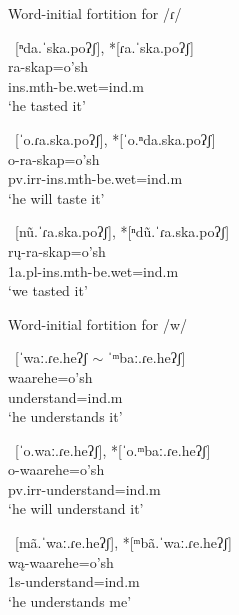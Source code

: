 \begin{exe}
\item\label{wordfortR} Word-initial fortition for /ɾ/
	\begin{xlist}
	\item\label{wordfortR1} ~\textnormal{[ⁿda.ˈska.poʔʃ], *[ɾa.ˈska.poʔʃ]}\\
	ra-skap=o'sh\\
	{ins.mth}-\textnormal{be.wet}={ind.m}\\
	\glt `he tasted it'
	\item\label{wordfortR2} ~\textnormal{[ˈo.ɾa.ska.poʔʃ], *[ˈo.ⁿda.ska.poʔʃ]}\\
	o-ra-skap=o'sh\\
	{pv.irr-ins.mth}-\textnormal{be.wet}={ind.m}\\
	\glt `he will taste it'
	\item\label{wordfortR3} ~\textnormal{[nũ.ˈɾa.ska.poʔʃ], *[ⁿdũ.ˈɾa.ska.poʔʃ]}\\
	rų-ra-skap=o'sh\\
	{1a.pl-ins.mth}-\textnormal{be.wet}={ind.m}\\
	\glt `we tasted it'
	\end{xlist}
\item\label{wordfortW} Word-initial fortition for /w/
	\begin{xlist}
	\item\label{wordfortW1} ~\textnormal{[ˈwaː.ɾe.heʔʃ $\sim$ ˈᵐbaː.ɾe.heʔʃ]}\\
	waarehe=o'sh\\
	\textnormal{understand}={ind.m}\\
	\glt `he understands it'
	\item\label{wordfortW2} ~\textnormal{[ˈo.waː.ɾe.heʔʃ], *[ˈo.ᵐbaː.ɾe.heʔʃ]}\\
	o-waarehe=o'sh\\
	pv.irr-\textnormal{understand}={ind.m}\\
	\glt `he will understand it'
	\item\label{wordfortW3} ~\textnormal{[mã.ˈwaː.ɾe.heʔʃ], *[ᵐbã.ˈwaː.ɾe.heʔʃ]}\\
	wą-waarehe=o'sh\\
	1s-\textnormal{understand}={ind.m}\\
	\glt `he understands me'
	\end{xlist}
\end{exe}

